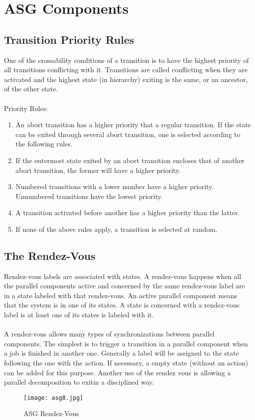 \documentclass[../main.tex]{subfiles}
\begin{document}
\section{ASG Components}

\subsection{Transition Priority Rules}
One of the crossability conditions of a transition is to have the highest priority of all transitions conflicting with it. Transitions are called conflicting when they are activated and the highest state (in hierarchy) exiting is the same, or an ancestor, of the other state.
\\\\
Priority Rules:
\begin{enumerate}
	\item An abort transition has a higher priority that a regular transition. If the state can be exited through several abort transition, one is selected according to the following rules.
	\item If the outermost state exited by an abort transition encloses that of another abort transition, the former will have a higher priority.  
	\item Numbered transitions with a lower number have a higher priority. Unnumbered transitions have the lowest priority.
	\item A transition activated before another has a higher priority than the latter.	
	\item If none of the above rules apply, a transition is selected at random.
\end{enumerate}

\subsection{The Rendez-Vous}
Rendez-vous labels are associated with states. A rendez-vous happens when all the parallel components active and concerned by the same rendez-vous label are in a state labeled with that rendez-vous. An active parallel component means that the system is in one of its states. A state is concerned with a rendez-vous label is at least one of its states is labeled with it.
\\\\
A rendez-vous allows many types of synchronizations between parallel components. The simplest is to trigger a transition in a parallel component when a job is finished in another one. Generally a label will be assigned to the state following the one with the action. If necessary, a empty state (without an action) can be added for this purpose. Another use of the rendez vous is allowing a parallel decomposition to exitin a disciplined way.
\begin{figure}[H]
    \centering
    \texttt{[image: asg8.jpg]}
    \caption{ASG Rendez-Vous}
    \label{asg8}
\end{figure}
\end{document}
